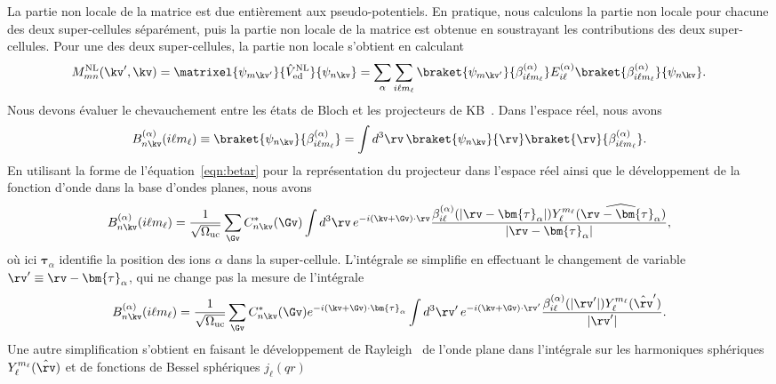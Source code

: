 La partie non locale de la matrice est due entièrement aux pseudo-potentiels. En pratique, nous calculons la partie non locale pour chacune des deux super-cellules séparément, puis la partie non locale de la matrice est obtenue en soustrayant les contributions des deux super-cellules. Pour une des deux super-cellules, la partie non locale s'obtient en calculant
\begin{equation}
    M_{mn}^\text{NL}(\kv',\kv) = \matrixel{\psi_{m\kv'}}{\hat{V}_\text{ed}^\text{NL}}{\psi_{n\kv}} = \sum_\alpha\sum_{i\ell m_\ell}\braket{\psi_{m\kv'}}{\beta^{(\alpha)}_{i\ell m_\ell}}E_{i\ell}^{(\alpha)}\braket{\beta^{(\alpha)}_{i\ell m_\ell}}{\psi_{n\kv}}.\label{eqn:M_NL}
\end{equation}
Nous devons évaluer le chevauchement entre les états de Bloch et les projecteurs de KB~\cite{kleinmanEfficaciousFormModel1982}. Dans l'espace réel, nous avons
\begin{equation}
    B_{n\kv}^{(\alpha)}(i\ell m_\ell)\equiv\braket{\psi_{n\kv}}{\beta_{i\ell m_\ell}^{(\alpha)}} = \int d^3\rv\,\braket{\psi_{n\kv}}{\rv}\braket{\rv}{\beta_{i\ell m_\ell}^{(\alpha)}}.
\end{equation}
En utilisant la forme de l'équation~\eqref{eqn:betar} pour la représentation du projecteur dans l'espace réel ainsi que le développement de la fonction d'onde dans la base d'ondes planes, nous avons
\begin{equation}
    B_{n\kv}^{(\alpha)}(i\ell m_\ell) =\frac{1}{\sqrt{\Omega_\text{uc}}}\sum_\Gv C^*_{n\kv}(\Gv)\int d^3\rv\,e^{-i(\kv+\Gv)\cdot\rv}\frac{\beta_{i\ell}^{(\alpha)}(|\rv-\bm{\tau}_\alpha|)Y_\ell^{m_\ell}(\widehat{\rv-\bm{\tau}_\alpha})}{|\rv-\bm{\tau}_\alpha|},
\end{equation}
où ici $\bm{\tau}_\alpha$ identifie la position des ions $\alpha$ dans la super-cellule. L'intégrale se simplifie en effectuant le changement de variable $\rv'\equiv\rv-\bm{\tau}_\alpha$, qui ne change pas la mesure de l'intégrale
\begin{equation}
    B_{n\kv}^{(\alpha)}(i\ell m_\ell) =\frac{1}{\sqrt{\Omega_\text{uc}}}\sum_\Gv C^*_{n\kv}(\Gv)e^{-i(\kv+\Gv)\cdot\bm{\tau}_{\alpha}}\int d^3\rv'\, e^{-i(\kv+\Gv)\cdot\rv'}\frac{\beta_{i\ell}^{(\alpha)}(|\rv'|)Y_\ell^{m_\ell}(\hat{\rv}')}{|\rv'|}.
\end{equation}
Une autre simplification s'obtient en faisant le développement de Rayleigh~\cite{arfkenMathematicalMethodsPhysicists2013} de l'onde plane dans l'intégrale sur les harmoniques sphériques $Y_\ell^{m_\ell}(\hat{\rv})$ et de fonctions de Bessel sphériques $j_\ell(qr)$
